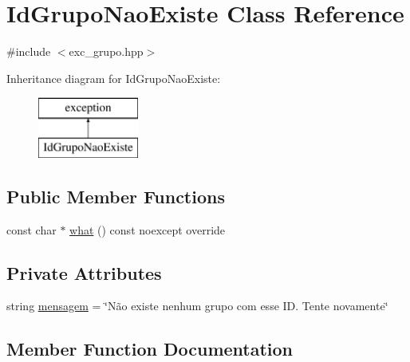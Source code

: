 \hypertarget{classIdGrupoNaoExiste}{}\section{Id\+Grupo\+Nao\+Existe Class Reference}
\label{classIdGrupoNaoExiste}


{\ttfamily \#include $<$exc\+\_\+grupo.\+hpp$>$}

Inheritance diagram for Id\+Grupo\+Nao\+Existe\+:\begin{figure}[H]
\begin{center}
\leavevmode
\includegraphics[height=2.000000cm]{classIdGrupoNaoExiste}
\end{center}
\end{figure}
\subsection*{Public Member Functions}
\begin{DoxyCompactItemize}
\item 
const char $\ast$ \hyperlink{classIdGrupoNaoExiste_a344839c288289dd67648514acb38da74}{what} () const noexcept override
\end{DoxyCompactItemize}
\subsection*{Private Attributes}
\begin{DoxyCompactItemize}
\item 
string \hyperlink{classIdGrupoNaoExiste_a75e9a2c40fb07070424acc3666b0babc}{mensagem} = \char`\"{}Não existe nenhum grupo com esse I\+D. Tente novamente\char`\"{}
\end{DoxyCompactItemize}


\subsection{Member Function Documentation}
\mbox{\label{classIdGrupoNaoExiste_a344839c288289dd67648514acb38da74}} 

